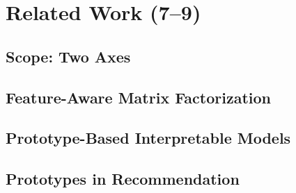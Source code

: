 \cleardoublepage
\chapter{Related Work (7--9)}   %
\label{ch:related}

\section{Scope: Two Axes}
\label{sec:rw-scope}

\section{Feature-Aware Matrix Factorization}
\label{sec:rw-feature-mf}

\section{Prototype-Based Interpretable Models}
\label{sec:rw-prototypes}

\section{Prototypes in Recommendation}
\label{sec:rw-proto-recsys}

